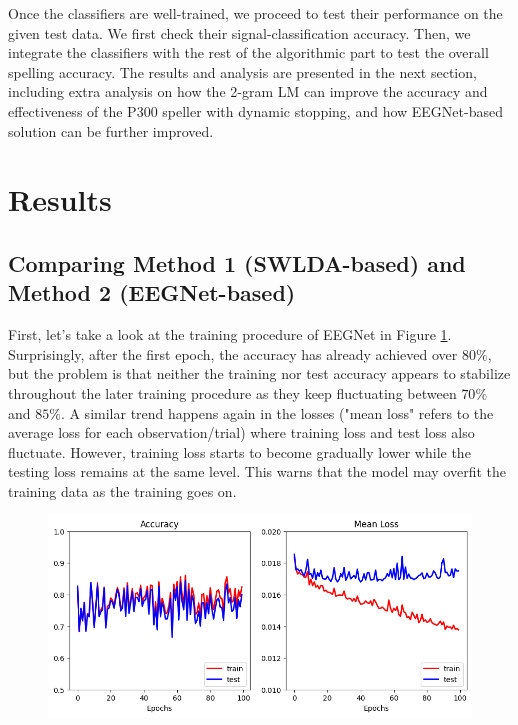 \documentclass{article}
\begin{document}
\vspace{-3mm}
Once the classifiers are well-trained, we proceed to test their performance on the given test data. We first check their signal-classification accuracy. Then, we integrate the classifiers with the rest of the algorithmic part to test the overall spelling accuracy. The results and analysis are presented in the next section, including extra analysis on how the 2-gram LM can improve the accuracy and effectiveness of the P300 speller with dynamic stopping, and how EEGNet-based solution can be further improved.


\section{Results} \label{Results}
\subsection{Comparing Method 1 (SWLDA-based) and Method 2 (EEGNet-based)}
First, let's take a look at the training procedure of EEGNet in Figure \ref{fig:8}. Surprisingly, after the first epoch, the accuracy has already achieved over $80\%$, but the problem is that neither the training nor test accuracy appears to stabilize throughout the later training procedure as they keep fluctuating between $70\%$ and $85\%$. A similar trend happens again in the losses ("mean loss" refers to the average loss for each observation/trial) where training loss and test loss also fluctuate. However, training loss starts to become gradually lower while the testing loss remains at the same level. This warns that the model may overfit the training data as the training goes on.

\vspace{-3mm}
\begin{figure}[H]
	\centering
	\includegraphics[width=0.8\linewidth]{eegnet_training.png}
	\label{fig:8}
\end{figure}
\end{document}

